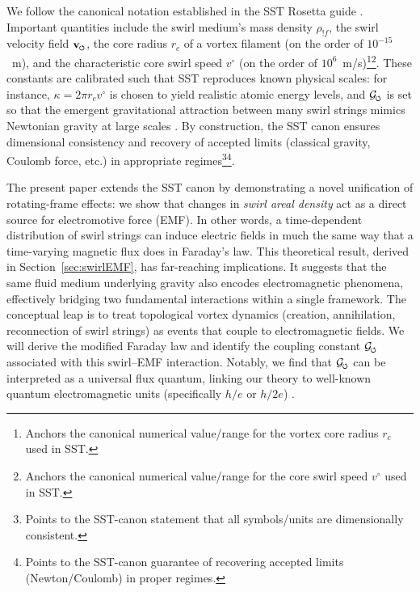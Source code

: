 \documentclass[12pt]{article}
\DeclareRobustCommand{\swirlarrow}{
\mathchoice{\mkern-2mu\scriptstyle\boldsymbol{\circlearrowleft}}%
{\mkern-2mu\scriptstyle\boldsymbol{\circlearrowleft}}%
{\mkern-2mu\scriptscriptstyle\boldsymbol{\circlearrowleft}}%
{\mkern-2mu\scriptscriptstyle\boldsymbol{\circlearrowleft}}
}%
\newcommand{\Gswirl}{\mathcal{G}_{\swirlarrow}}
\begin{document}
We follow the canonical notation established in the SST Rosetta guide \cite{Iskandarani2025Rosetta,Iskandarani2025Canon}. Important quantities include the swirl medium's mass density $\rho_{!f}$, the swirl velocity field $\mathbf{v}_{\swirlarrow}$, the core radius $r_c$ of a vortex filament (on the order of $10^{-15}$~m), and the characteristic core swirl speed $v^{\circ}$ (on the order of $10^{6}$~m/s)\footnote{Anchors the canonical numerical value/range for the vortex core radius $r_c$ used in SST.}\footnote{Anchors the canonical numerical value/range for the core swirl speed $v^{\circ}$ used in SST.}. These constants are calibrated such that SST reproduces known physical scales: for instance, $\kappa = 2\pi r_c v^{\circ}$ is chosen to yield realistic atomic energy levels, and $\Gswirl$ is set so that the emergent gravitational attraction between many swirl strings mimics Newtonian gravity at large scales \cite{Iskandarani2025Canon}. By construction, the SST canon ensures dimensional consistency and recovery of accepted limits (classical gravity, Coulomb force, etc.) in appropriate regimes\footnote{Points to the SST-canon statement that all symbols/units are dimensionally consistent.}\footnote{Points to the SST-canon guarantee of recovering accepted limits (Newton/Coulomb) in proper regimes.}.




The present paper extends the SST canon by demonstrating a novel unification of rotating-frame effects: we show that changes in \emph{swirl areal density} act as a direct source for electromotive force (EMF). In other words, a time-dependent distribution of swirl strings can induce electric fields in much the same way that a time-varying magnetic flux does in Faraday's law. This theoretical result, derived in Section~\ref{sec:swirlEMF}, has far-reaching implications. It suggests that the same fluid medium underlying gravity also encodes electromagnetic phenomena, effectively bridging two fundamental interactions within a single framework. The conceptual leap is to treat topological vortex dynamics (creation, annihilation, reconnection of swirl strings) as events that couple to electromagnetic fields. We will derive the modified Faraday law and identify the coupling constant $\Gswirl$ associated with this swirl–EMF interaction. Notably, we find that $\Gswirl$ can be interpreted as a universal flux quantum, linking our theory to well-known quantum electromagnetic units (specifically $h/e$ or $h/2e$) \cite{Deaver1961,Doll1961}.
\end{document}
